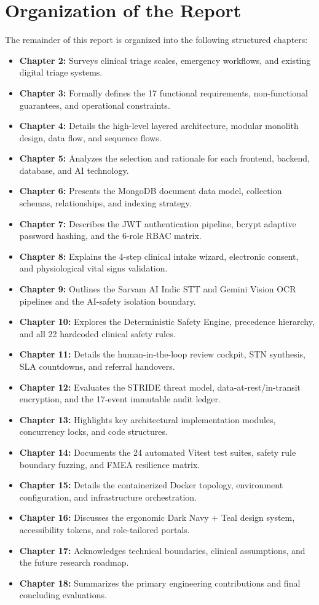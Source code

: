 \documentclass[11pt,a4paper,oneside]{report}
\begin{document}
\section{Organization of the Report}
The remainder of this report is organized into the following structured chapters:
\begin{itemize}[leftmargin=20pt]
  \item \textbf{Chapter 2:} Surveys clinical triage scales, emergency workflows, and existing digital triage systems.
  \item \textbf{Chapter 3:} Formally defines the 17 functional requirements, non-functional guarantees, and operational constraints.
  \item \textbf{Chapter 4:} Details the high-level layered architecture, modular monolith design, data flow, and sequence flows.
  \item \textbf{Chapter 5:} Analyzes the selection and rationale for each frontend, backend, database, and AI technology.
  \item \textbf{Chapter 6:} Presents the MongoDB document data model, collection schemas, relationships, and indexing strategy.
  \item \textbf{Chapter 7:} Describes the JWT authentication pipeline, bcrypt adaptive password hashing, and the 6-role RBAC matrix.
  \item \textbf{Chapter 8:} Explains the 4-step clinical intake wizard, electronic consent, and physiological vital signs validation.
  \item \textbf{Chapter 9:} Outlines the Sarvam AI Indic STT and Gemini Vision OCR pipelines and the AI-safety isolation boundary.
  \item \textbf{Chapter 10:} Explores the Deterministic Safety Engine, precedence hierarchy, and all 22 hardcoded clinical safety rules.
  \item \textbf{Chapter 11:} Details the human-in-the-loop review cockpit, STN synthesis, SLA countdowns, and referral handovers.
  \item \textbf{Chapter 12:} Evaluates the STRIDE threat model, data-at-rest/in-transit encryption, and the 17-event immutable audit ledger.
  \item \textbf{Chapter 13:} Highlights key architectural implementation modules, concurrency locks, and code structures.
  \item \textbf{Chapter 14:} Documents the 24 automated Vitest test suites, safety rule boundary fuzzing, and FMEA resilience matrix.
  \item \textbf{Chapter 15:} Details the containerized Docker topology, environment configuration, and infrastructure orchestration.
  \item \textbf{Chapter 16:} Discusses the ergonomic Dark Navy + Teal design system, accessibility tokens, and role-tailored portals.
  \item \textbf{Chapter 17:} Acknowledges technical boundaries, clinical assumptions, and the future research roadmap.
  \item \textbf{Chapter 18:} Summarizes the primary engineering contributions and final concluding evaluations.
\end{itemize}
\end{document}
